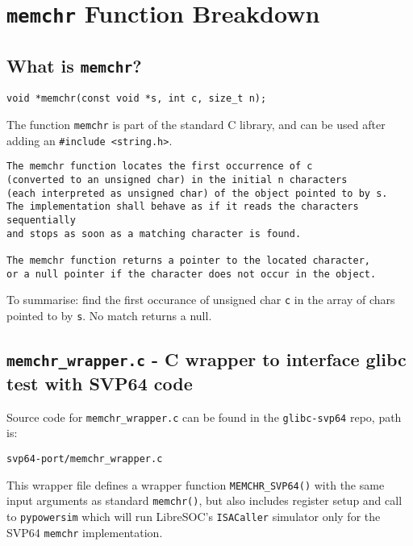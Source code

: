 %

\section{\texttt{memchr} Function Breakdown}

\subsection{What is \texttt{memchr}?}

\begin{verbatim}
void *memchr(const void *s, int c, size_t n);
\end{verbatim}

The function \texttt{memchr} is part of the standard C library, and can be used
after adding an \texttt{\#include <string.h>}.

\begin{verbatim}
The memchr function locates the first occurrence of c
(converted to an unsigned char) in the initial n characters
(each interpreted as unsigned char) of the object pointed to by s.
The implementation shall behave as if it reads the characters sequentially
and stops as soon as a matching character is found.

The memchr function returns a pointer to the located character,
or a null pointer if the character does not occur in the object.
\end{verbatim}

To summarise: find the first occurance of unsigned char \texttt{c} in the
array of chars pointed to by \texttt{s}. No match returns a null.

\subsection{\texttt{memchr\_wrapper.c} - C wrapper to interface glibc test with SVP64 code}

Source code for \texttt{memchr\_wrapper.c} can be found in the
\texttt{glibc-svp64} repo, path is:
\begin{verbatim}
svp64-port/memchr_wrapper.c
\end{verbatim}

This wrapper file defines a wrapper function \texttt{MEMCHR\_SVP64()} with the
same input arguments as standard \texttt{memchr()}, but also includes
register setup and call to \texttt{pypowersim} which will run
LibreSOC's \texttt{ISACaller} simulator only for
the \acrshort{SVP64} \texttt{memchr} implementation.\\

